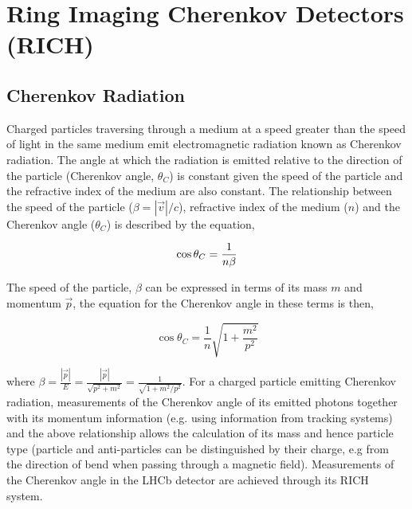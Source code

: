 \section{Ring Imaging Cherenkov Detectors (RICH)}
\subsection*{Cherenkov Radiation}
Charged particles traversing through a medium at a speed greater than the speed of light in the same medium emit electromagnetic radiation known as Cherenkov radiation. The angle at which the radiation is emitted relative to the direction of the particle (Cherenkov angle, $\theta_C$) is constant given the speed of the particle and the refractive index of the medium are also constant. The relationship between the speed of the particle ($\beta = |\vec{v}|/c$), refractive index of the medium ($n$) and the Cherenkov angle ($\theta_C$) is described by the equation,

\begin{equation}
	\cos{\theta_C} = \frac{1}{n\beta}\\
	\label{equation: Cherenkov radiation}
\end{equation}

The speed of the particle, $\beta$ can be expressed in terms of its mass $m$ and momentum $\vec{p}$, the equation for the Cherenkov angle in these terms is then,

\begin{equation}
	\cos{\theta_C} = \frac{1}{n}\sqrt{1 + \frac{m^2}{p^2}}
	\label{equation: Cherenkov angle in terms of mass and momentum}
\end{equation}

where $\beta=\frac{|\vec{p}|}{E} = \frac{|\vec{p}|}{\sqrt{p^2 + m^2}} = \frac{1}{\sqrt{1 + m^2/p^2}}$. For a charged particle emitting Cherenkov radiation, measurements of the Cherenkov angle of its emitted photons together with its momentum information (e.g. using information from tracking systems) and the above relationship allows the calculation of its mass and hence particle type (particle and anti-particles can be distinguished by their charge, e.g from the direction of bend when passing through a magnetic field). Measurements of the Cherenkov angle in the LHCb detector are achieved through its RICH system. 



